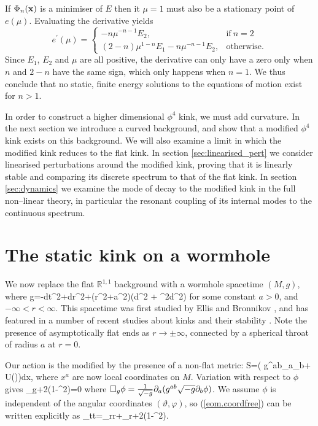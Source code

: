 If $\Phi_n({\bf x})$ is a minimiser of $E$ then it $\mu=1$ must also be a stationary point of $e(\mu)$. Evaluating the derivative yields
\[
e^\prime(\mu)= \begin{cases}
      -n\mu^{-n-1}E_2, & \text{if}\ n=2 \\
      (2-n)\mu^{1-n}E_1 -n\mu^{-n-1}E_2, & \text{otherwise}.
    \end{cases}
\]
Since $E_1$, $E_2$ and $\mu$ are all positive, the derivative can only have a zero only when $n$ and $2-n$ have the same sign, which only happens when $n=1$. We thus conclude that no static, finite energy solutions to the equations of motion exist for $n>1$.

In order to construct a higher dimensional $\phi^4$ kink, we must add curvature. In the next section we introduce a curved background, and show that a modified $\phi^4$ kink exists on this background. We will also examine a limit in which the modified kink reduces to the flat kink. In section \ref{sec:linearised_pert} we consider linearised perturbations around the modified kink, proving that it is linearly stable and comparing its discrete spectrum to that of the flat kink. In section \ref{sec:dynamics} we examine the mode of decay to the modified kink in the full non--linear theory, in particular the resonant coupling of its internal modes to the continuous spectrum.

\section{The static kink on a wormhole}

We now replace the flat $\mathbb{R}^{1,1}$ background with a wormhole spacetime $(M,g)$, where
\be
\nonumber
g=-dt^2+dr^2+(r^2+a^2)(d\vartheta^2 + \sin^2\vartheta d\varphi^2)
\ee
for some constant $a>0$, and $-\infty<r<\infty$. This spacetime was first studied by Ellis \cite{Ellis} and Bronnikov \cite{Bronnikov}, and has featured in a number of recent studies about kinks and their stability \cite{wavemaps,SG}. Note the presence of asymptotically flat ends as $r\rightarrow\pm\infty$, connected by a spherical throat of radius $a$ at $r=0$.

Our action is the modified by the presence of a non-flat metric:
\be
\nonumber
S=\int\bigg( g^{ab}\p_a\phi\p_b\phi + U(\phi)\bigg)dx,
\ee
where $x^a$ are now local coordinates on $M$. Variation with respect to $\phi$ gives
\be
\label{eom.coordfree}
\square_g\phi+2\phi(1-\phi^2)=0
\ee
where $\square_g\phi=\frac{1}{\sqrt{-g}}\partial_a(g^{ab}\sqrt{-g}\partial_b\phi)$. We assume $\phi$ is independent of the angular coordinates $(\vartheta,\varphi)$, so (\ref{eom.coordfree}) can be written explicitly as
\be
\label{eom.coords}
\phi_{tt}=\phi_{rr}+\phi_r+2\phi(1-\phi^2).
\ee

